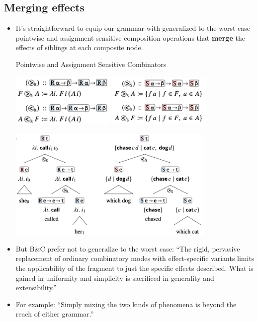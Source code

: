 \documentclass{article}
\begin{document}
\subsection{Merging effects}
\begin{itemize}
  \item It's straightforward to equip our grammar with generalized-to-the-worst-case pointwise and assignment sensitive composition
  operations that \textbf{merge} the effects of siblings at each composite node.
  \begin{exe}
    \ex Pointwise and Assignment Sensitive Combinators
    \begin{center}
      \includegraphics[width=5cm]{clips/24.png}
      \includegraphics[width=5cm]{clips/25.png}
    \end{center}
    \ex \label{23} \hfill
      \begin{center}
        \includegraphics[width=10cm]{clips/23.png}
      \end{center}
  \end{exe}
  \item But B\&C prefer not to generalize to the worst case: ``The rigid, pervasive replacement of ordinary combinatory modes with effect-specific
    variants limits the applicability of the fragment to just the specific effects described. What is gained in uniformity and simplicity is
    sacrificed in generality and extensibility.''
  \item For example: ``Simply mixing the two kinds of phenomena is beyond the reach of either grammar.''

\end{itemize}
\end{document}

